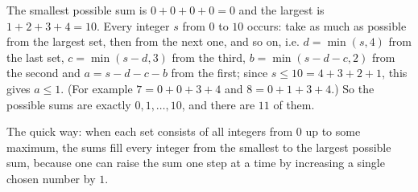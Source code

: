 The smallest possible sum is $0+0+0+0=0$ and the largest is $1+2+3+4=10$. Every integer $s$ from $0$ to $10$ occurs: take as much as possible from the largest set, then from the next one, and so on, i.e. $d=\min(s,4)$ from the last set, $c=\min(s-d,3)$ from the third, $b=\min(s-d-c,2)$ from the second and $a=s-d-c-b$ from the first; since $s\le10=4+3+2+1$, this gives $a\le1$. (For example $7=0+0+3+4$ and $8=0+1+3+4$.) So the possible sums are exactly $0,1,\dots,10$, and there are $\boxed{11}$ of them.

The quick way: when each set consists of all integers from $0$ up to some maximum, the sums fill every integer from the smallest to the largest possible sum, because one can raise the sum one step at a time by increasing a single chosen number by $1$.
